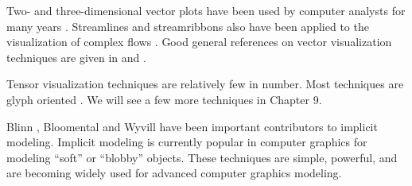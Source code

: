 Two- and three-dimensional vector plots have been used by computer analysts for many years \cite{Fuller80}. Streamlines and streamribbons also have been applied to the visualization of complex flows \cite{Volpe89}. Good general references on vector visualization techniques are given in \cite{Helman90} and \cite{Richter90}.

Tensor visualization techniques are relatively few in number. Most techniques are glyph oriented \cite{Haber90} \cite{deLeeuw93}. We will see a few more techniques in Chapter 9.

Blinn \cite{Blinn82}, Bloomental \cite{Bloomenthal88} \cite{Bloomenthal97} and Wyvill \cite{Wyvill86} have been important contributors to implicit modeling. Implicit modeling is currently popular in computer graphics for modeling ``soft'' or ``blobby'' objects. These techniques are simple, powerful, and are becoming widely used for advanced computer graphics modeling.

\printbibliography


